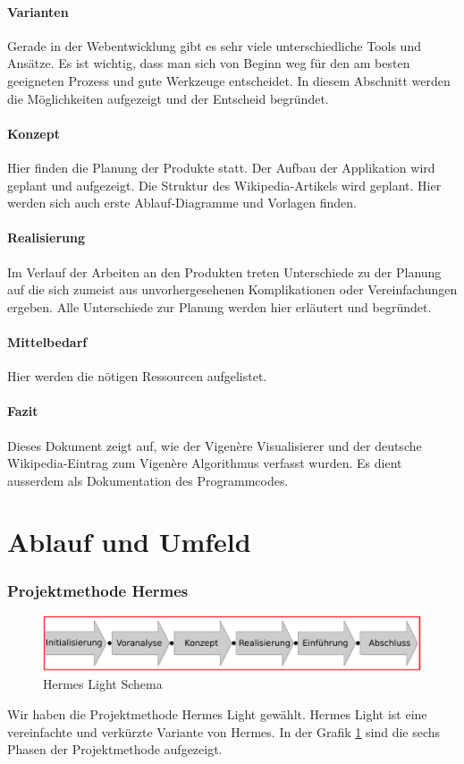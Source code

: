 \documentclass[11pt,paper=a4,final]{scrartcl}
\begin{document}
\subsection{Varianten}
Gerade in der Webentwicklung gibt es sehr viele unterschiedliche Tools und
Ans\"atze. Es ist wichtig, dass man sich von Beginn weg f\"ur den am besten
geeigneten Prozess und gute Werkzeuge entscheidet. In diesem Abschnitt werden
die M\"oglichkeiten aufgezeigt und der Entscheid begr\"undet.
\subsection{Konzept}
Hier finden die Planung der Produkte statt. Der Aufbau der Applikation wird
geplant und aufgezeigt. Die Struktur des Wikipedia-Artikels wird geplant. Hier
werden sich auch erste Ablauf-Diagramme und Vorlagen finden.
\subsection{Realisierung}
Im Verlauf der Arbeiten an den Produkten treten Unterschiede zu der Planung auf
die sich zumeist aus unvorhergesehenen Komplikationen oder Vereinfachungen
ergeben. Alle Unterschiede zur Planung werden hier erl\"autert und begr\"undet.
\subsection{Mittelbedarf}
Hier werden die n\"otigen Ressourcen aufgelistet.
\subsection{Fazit}
Dieses Dokument zeigt auf, wie der Vigen\`ere Visualisierer und der deutsche
Wikipedia-Eintrag zum Vigen\`ere Algorithmus verfasst wurden. Es dient ausserdem
als Dokumentation des Programmcodes.
\part{Ablauf und Umfeld}
\section{Projektmethode Hermes}
\begin{figure}[htb!]
  \centering
  \includegraphics[width=\textwidth]{hermes.pdf}
  \caption{Hermes Light Schema}
  \label{fig:hermes_schema}
\end{figure}
Wir haben die Projektmethode Hermes Light gew\"ahlt. Hermes Light ist eine
vereinfachte und verkürzte Variante von Hermes.\cite{adminch:hermes} In der Grafik
\ref{fig:hermes_schema} sind die sechs Phasen der Projektmethode aufgezeigt.
\end{document}
